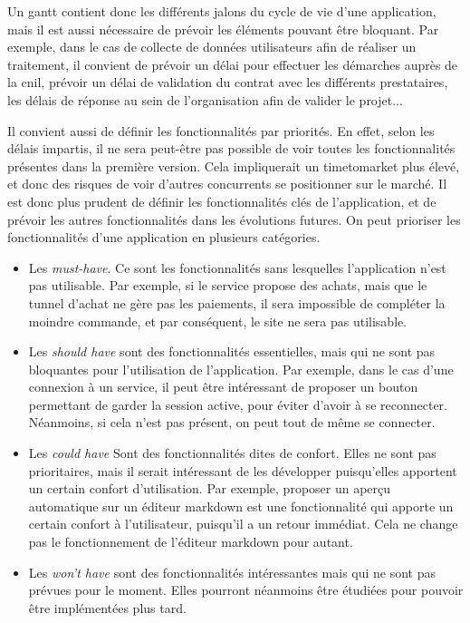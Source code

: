 
Un \gls{gantt} contient donc les différents jalons du cycle de vie d'une application, mais il est aussi nécessaire de prévoir les éléments pouvant être bloquant. Par exemple, dans le cas de collecte de données utilisateurs afin de réaliser un traitement, il convient de prévoir un délai pour effectuer les démarches auprès de la \gls{cnil}, prévoir un délai de validation du contrat avec les différents prestataires, les délais de réponse au sein de l'organisation afin de valider le projet...

Il convient aussi de définir les fonctionnalités par priorités. En effet, selon les délais impartis, il ne sera peut-être pas possible de voir toutes les fonctionnalités présentes dans la première version. Cela impliquerait un \gls{timetomarket} plus élevé, et donc des risques de voir d'autres concurrents se positionner sur le marché. Il est donc plus prudent de définir les fonctionnalités clés de l'application, et de prévoir les autres fonctionnalités dans les évolutions futures. On peut prioriser les fonctionnalités d'une application en plusieurs catégories.

\begin{itemize}
	\item Les \emph{must-have}. Ce sont les fonctionnalités sans lesquelles l'application n'est pas utilisable. Par exemple, si le service propose des achats, mais que le tunnel d'achat ne gère pas les paiements, il sera impossible de compléter la moindre commande, et par conséquent, le site ne sera pas utilisable.
	\item Les \emph{should have} sont des fonctionnalités essentielles, mais qui ne sont pas bloquantes pour l'utilisation de l'application. Par exemple, dans le cas d'une connexion à un service, il peut être intéressant de proposer un bouton permettant de garder la session active, pour éviter d'avoir à se reconnecter. Néanmoins, si cela n'est pas présent, on peut tout de même se connecter.
	\item Les \emph{could have} Sont des fonctionnalités dites de confort. Elles ne sont pas prioritaires, mais il serait intéressant de les développer puisqu'elles apportent un certain confort d'utilisation. Par exemple, proposer un aperçu automatique sur un éditeur \gls{markdown} est une fonctionnalité qui apporte un certain confort à l'utilisateur, puisqu'il a un retour immédiat. Cela ne change pas le fonctionnement de l'éditeur \gls{markdown} pour autant.
	\item Les \emph{won't have} sont des fonctionnalités intéressantes mais qui ne sont pas prévues pour le moment. Elles pourront néanmoins être étudiées pour pouvoir être implémentées plus tard. 
\end{itemize}


